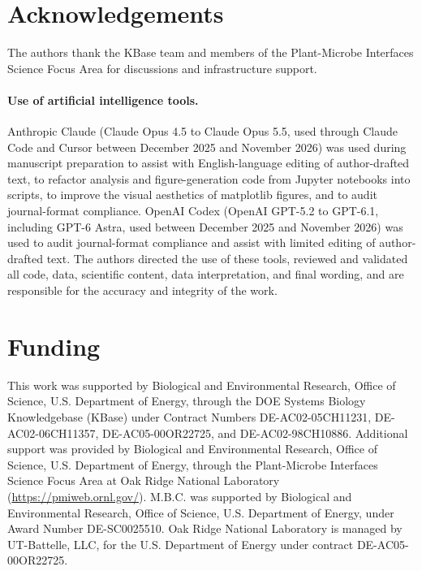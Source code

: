
\section*{Acknowledgements}

The authors thank the KBase team and members of the Plant-Microbe Interfaces Science Focus Area for discussions and infrastructure support.

\paragraph*{Use of artificial intelligence tools.}
Anthropic Claude (Claude Opus 4.5 to Claude Opus 5.5, used through Claude Code and Cursor between December 2025 and November 2026) was used during manuscript preparation to assist with English-language editing of author-drafted text, to refactor analysis and figure-generation code from Jupyter notebooks into scripts, to improve the visual aesthetics of matplotlib figures, and to audit journal-format compliance.
OpenAI Codex (OpenAI GPT-5.2 to GPT-6.1, including GPT-6 Astra, used between December 2025 and November 2026) was used to audit journal-format compliance and assist with limited editing of author-drafted text.
The authors directed the use of these tools, reviewed and validated all code, data, scientific content, data interpretation, and final wording, and are responsible for the accuracy and integrity of the work.

\section*{Funding}

This work was supported by Biological and Environmental Research, Office of Science, U.S. Department of Energy,
through the DOE Systems Biology Knowledgebase (KBase)
under Contract Numbers DE-AC02-05CH11231, DE-AC02-06CH11357, DE-AC05-00OR22725, and DE-AC02-98CH10886.
Additional support was provided by Biological and Environmental Research, Office of Science, U.S. Department of Energy,
through the Plant-Microbe Interfaces Science Focus Area
at Oak Ridge National Laboratory (\url{https://pmiweb.ornl.gov/}).
M.B.C. was supported by Biological and Environmental Research, Office of Science, U.S. Department of Energy,
under Award Number DE-SC0025510.
Oak Ridge National Laboratory is managed by UT-Battelle, LLC,
for the U.S. Department of Energy under contract DE-AC05-00OR22725.
